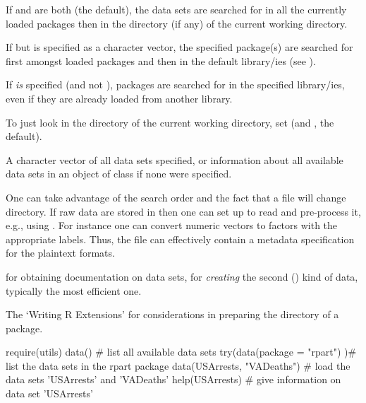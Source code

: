 \begin{Details}
If  and  are both  (the
default), the data sets are searched for in all the currently loaded
packages then in the  directory (if any) of the current
working directory.

If  but  is specified as a
character vector, the specified package(s) are searched for first
amongst loaded packages and then in the default library/ies
(see ).

If  \emph{is} specified (and not ), packages
are searched for in the specified library/ies, even if they are
already loaded from another library.

To just look in the  directory of the current working
directory, set  (and , the default).
\end{Details}
%
\begin{Value}
A character vector of all data sets specified, or information about
all available data sets in an object of class  if
none were specified.
\end{Value}
%
\begin{Note}\relax
One can take advantage of the search order and the fact that a
 file will change directory.  If raw data are stored in
 then one can set up  to read
 and pre-process it, e.g., using .
For instance one can convert numeric vectors to factors with the
appropriate labels.  Thus, the  file can effectively contain
a metadata specification for the plaintext formats.
\end{Note}
%
\begin{SeeAlso}\relax
{} for obtaining documentation on data sets,
 for \emph{creating} the second () kind
of data, typically the most efficient one.

The `Writing R Extensions' for considerations in preparing the
 directory of a package.
\end{SeeAlso}
%
\begin{Examples}
\begin{ExampleCode}
require(utils)
data()                       # list all available data sets
try(data(package = "rpart") )# list the data sets in the rpart package
data(USArrests, "VADeaths")  # load the data sets 'USArrests' and 'VADeaths'
help(USArrests)              # give information on data set 'USArrests'
\end{ExampleCode}
\end{Examples}
